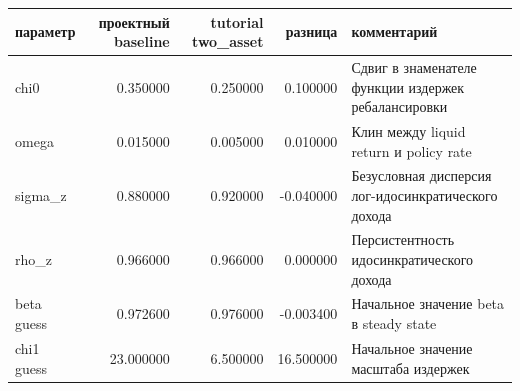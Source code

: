 \begin{tabular}{lrrrl}
\toprule
параметр & проектный baseline & tutorial two_asset & разница & комментарий \\
\midrule
chi0 & 0.350000 & 0.250000 & 0.100000 & Сдвиг в знаменателе функции издержек ребалансировки \\
omega & 0.015000 & 0.005000 & 0.010000 & Клин между liquid return и policy rate \\
sigma_z & 0.880000 & 0.920000 & -0.040000 & Безусловная дисперсия лог-идосинкратического дохода \\
rho_z & 0.966000 & 0.966000 & 0.000000 & Персистентность идосинкратического дохода \\
beta guess & 0.972600 & 0.976000 & -0.003400 & Начальное значение beta в steady state \\
chi1 guess & 23.000000 & 6.500000 & 16.500000 & Начальное значение масштаба издержек \\
\bottomrule
\end{tabular}

